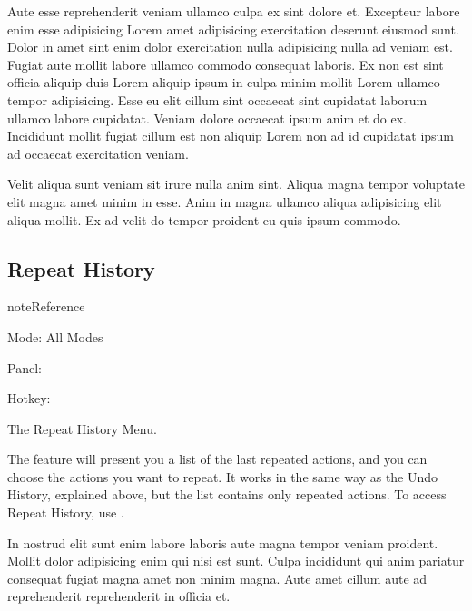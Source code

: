 \documentclass[a4paper,10pt,french]{sphinxmanual}
\let\sphinxpxdimen\pdfpxdimen\else\newdimen\sphinxpxdimen
\begin{document}
Aute esse reprehenderit veniam ullamco culpa ex sint dolore et. Excepteur labore enim esse adipisicing Lorem amet adipisicing exercitation deserunt eiusmod sunt. Dolor in amet sint enim dolor exercitation nulla adipisicing nulla ad veniam est. Fugiat aute mollit labore ullamco commodo consequat laboris. Ex non est sint officia aliquip duis Lorem aliquip ipsum in culpa minim mollit Lorem ullamco tempor adipisicing. Esse eu elit cillum sint occaecat sint cupidatat laborum ullamco labore cupidatat. Veniam dolore occaecat ipsum anim et do ex. Incididunt mollit fugiat cillum est non aliquip Lorem non ad id cupidatat ipsum ad occaecat exercitation veniam.

Velit aliqua sunt veniam sit irure nulla anim sint. Aliqua magna tempor voluptate elit magna amet minim in esse. Anim in magna ullamco aliqua adipisicing elit aliqua mollit. Ex ad velit do tempor proident eu quis ipsum commodo.


\subsection{Repeat History}
\label{\detokenize{docs/tuts/autocad-tut01:repeat-history}}\label{\detokenize{docs/tuts/autocad-tut01:bpy-ops-ed-undo-history}}
\begin{sphinxadmonition}{note}{Reference}

\begin{DUlineblock}{0em}
\item[] Mode:     All Modes
\item[] Panel:    
\item[] Hotkey:   
\end{DUlineblock}
\end{sphinxadmonition}
\begin{wrapfigure}{r}{0pt}
\centering
\noindent\sphinxincludegraphics[height=200\sphinxpxdimen]{{tumblr_mfe80vYmn31qat99uo4_500}.jpg}
\end{wrapfigure}

The Repeat History Menu.

The  feature will present you a list of the last repeated actions,
and you can choose the actions you want to repeat.
It works in the same way as the Undo History, explained above,
but the list contains only repeated actions. To access Repeat History, use .

In nostrud elit sunt enim labore laboris aute magna tempor veniam proident. Mollit dolor adipisicing enim qui nisi est sunt. Culpa incididunt qui anim pariatur consequat fugiat magna amet non minim magna. Aute amet cillum aute ad reprehenderit reprehenderit in officia et.
\end{document}
